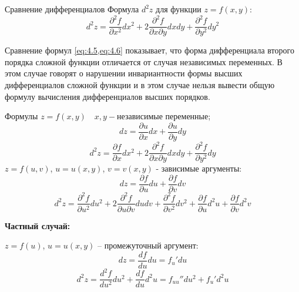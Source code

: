 \begin{tbox}{Сравнение дифференциалов}
	Формула $d^2 z$ для функции $z = f(x,y)$:
	\begin{equation} \label{eq:4.6}
		\boxed{d^2 z = \frac{\partial^2 f}{\partial x^2} dx^2 + 2 \frac{\partial^2 f}{\partial x \partial y} dx dy + \frac{\partial^2 f}{\partial y^2} dy^2}
	\end{equation}

	Сравнение формул \cref{eq:4.5,eq:4.6} показывает, что форма дифференциала второго порядка сложной функции отличается от случая независимых переменных. В этом случае говорят о нарушении инвариантности формы высших дифференциалов сложной функции и в этом случае нельзя вывести общую формулу вычисления дифференциалов высших порядков.
\end{tbox}

\begin{tbox}{Формулы}
	\(z = f(x,y) \quad x, y - \text{независимые переменные}\);\\
	\[dz = \frac{\partial u}{\partial x} dx + \frac{\partial u}{\partial y} dy\]
	\[d^2 z = \frac{\partial f}{\partial x} dx^2 + 2 \frac{\partial^2 f}{\partial x \partial y} dxdy + \frac{\partial^2 f}{\partial y^2} dy\]
	$z = f(u,v)$, $u = u(x,y)$, $v = v(x,y)$ - зависимые аргументы:
	\[dz = \frac{\partial f}{\partial u} du + \frac{\partial f}{\partial v} dv\]
	\[d^2 z = \frac{\partial^2 f}{\partial u^2} du^2 + 2 \frac{\partial^2 f}{\partial u \partial v} dudv + \frac{\partial^2 f}{\partial v^2} dv^2 + \frac{\partial f}{\partial u} d^2 u + \frac{\partial f}{\partial v} d^2 v\]

	\begin{center}
		\textbf{Частный случай:}
	\end{center}
	$z = f(u)$, $u = u(x,y)$ -- промежуточный аргумент:
	\[dz = \frac{df}{du}du = f_u' du\]
	\[d^2 z = \frac{d^2 f}{du^2} du^2 + \frac{df}{du} d^2 u = f_{uu}'' du^2 + f_u' d^2 u\]
\end{tbox}